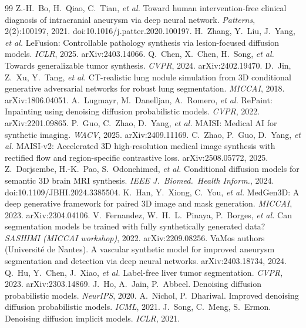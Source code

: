 \documentclass[11pt,a4paper,oneside]{report}
\begin{document}
\begin{thebibliography}{99}\small
{} Z.-H.~Bo, H.~Qiao, C.~Tian, \emph{et al.} Toward human intervention-free clinical diagnosis of intracranial aneurysm via deep neural network. \emph{Patterns}, 2(2):100197, 2021. doi:10.1016/j.patter.2020.100197.
 H.~Zhang, Y.~Liu, J.~Yang, \emph{et al.} LeFusion: Controllable pathology synthesis via lesion-focused diffusion models. \emph{ICLR}, 2025. arXiv:2403.14066.
 Q.~Chen, X.~Chen, H.~Song, \emph{et al.} Towards generalizable tumor synthesis. \emph{CVPR}, 2024. arXiv:2402.19470.
 D.~Jin, Z.~Xu, Y.~Tang, \emph{et al.} CT-realistic lung nodule simulation from 3D conditional generative adversarial networks for robust lung segmentation. \emph{MICCAI}, 2018. arXiv:1806.04051.
 A.~Lugmayr, M.~Danelljan, A.~Romero, \emph{et al.} RePaint: Inpainting using denoising diffusion probabilistic models. \emph{CVPR}, 2022. arXiv:2201.09865.
 P.~Guo, C.~Zhao, D.~Yang, \emph{et al.} MAISI: Medical AI for synthetic imaging. \emph{WACV}, 2025. arXiv:2409.11169.
 C.~Zhao, P.~Guo, D.~Yang, \emph{et al.} MAISI-v2: Accelerated 3D high-resolution medical image synthesis with rectified flow and region-specific contrastive loss. arXiv:2508.05772, 2025.
 Z.~Dorjsembe, H.-K.~Pao, S.~Odonchimed, \emph{et al.} Conditional diffusion models for semantic 3D brain MRI synthesis. \emph{IEEE J.\ Biomed.\ Health Inform.}, 2024. doi:10.1109/JBHI.2024.3385504.
 K.~Han, Y.~Xiong, C.~You, \emph{et al.} MedGen3D: A deep generative framework for paired 3D image and mask generation. \emph{MICCAI}, 2023. arXiv:2304.04106.
 V.~Fernandez, W.~H.~L.~Pinaya, P.~Borges, \emph{et al.} Can segmentation models be trained with fully synthetically generated data? \emph{SASHIMI (MICCAI workshop)}, 2022. arXiv:2209.08256.
 VaMos authors (Universit\'e de Nantes). A vascular synthetic model for improved aneurysm segmentation and detection via deep neural networks. arXiv:2403.18734, 2024.
 Q.~Hu, Y.~Chen, J.~Xiao, \emph{et al.} Label-free liver tumor segmentation. \emph{CVPR}, 2023. arXiv:2303.14869.
 J.~Ho, A.~Jain, P.~Abbeel. Denoising diffusion probabilistic models. \emph{NeurIPS}, 2020.
 A.~Nichol, P.~Dhariwal. Improved denoising diffusion probabilistic models. \emph{ICML}, 2021.
 J.~Song, C.~Meng, S.~Ermon. Denoising diffusion implicit models. \emph{ICLR}, 2021.

\end{thebibliography}
\end{document}
